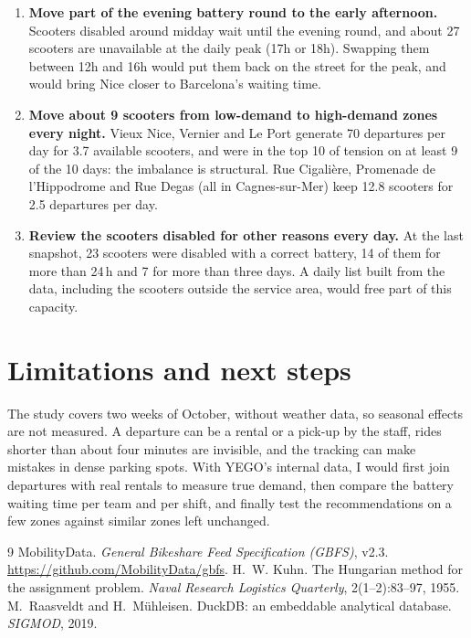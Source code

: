 \documentclass[11pt,a4paper]{article}
\begin{document}
\begin{enumerate}
  \item \textbf{Move part of the evening battery round to the early afternoon.} Scooters disabled
  around midday wait until the evening round, and about 27 scooters are unavailable at the
  daily peak (17h or 18h). Swapping them between 12h and 16h would put them back on the street
  for the peak, and would bring Nice closer to Barcelona's waiting time.
  \item \textbf{Move about 9 scooters from low-demand to high-demand zones every night.}
  Vieux Nice, Vernier and Le Port generate 70 departures per day for 3.7 available scooters,
  and were in the top 10 of tension on at least 9 of the 10 days: the
  imbalance is structural. Rue Cigalière, Promenade de l'Hippodrome and Rue Degas (all in Cagnes-sur-Mer) keep 12.8 scooters for 2.5
  departures per day.
  \item \textbf{Review the scooters disabled for other reasons every day.} At the last snapshot,
  23 scooters were disabled with a correct battery, 14 of them for more than
  24\,h and 7 for more than three days. A daily list built from the data,
  including the scooters outside the service area, would free part of this capacity.
\end{enumerate}

\section{Limitations and next steps}

The study covers two weeks of October, without weather data, so seasonal effects are not measured.
A departure can be a rental or a pick-up by the staff, rides shorter than about four minutes are
invisible, and the tracking can make mistakes in dense parking spots. With YEGO's internal data, I
would first join departures with real rentals to measure true demand, then compare the battery
waiting time per team and per shift, and finally test the recommendations on a few zones against
similar zones left unchanged.

{\small
\begin{thebibliography}{9}
\setlength{\itemsep}{0pt}
 MobilityData. \emph{General Bikeshare Feed Specification (GBFS)}, v2.3.
  \url{https://github.com/MobilityData/gbfs}.
 H.~W. Kuhn. The Hungarian method for the assignment problem.
  \emph{Naval Research Logistics Quarterly}, 2(1--2):83--97, 1955.
 M.~Raasveldt and H.~M\"uhleisen. DuckDB: an embeddable analytical database.
  \emph{SIGMOD}, 2019.
\end{thebibliography}
}
\end{document}

